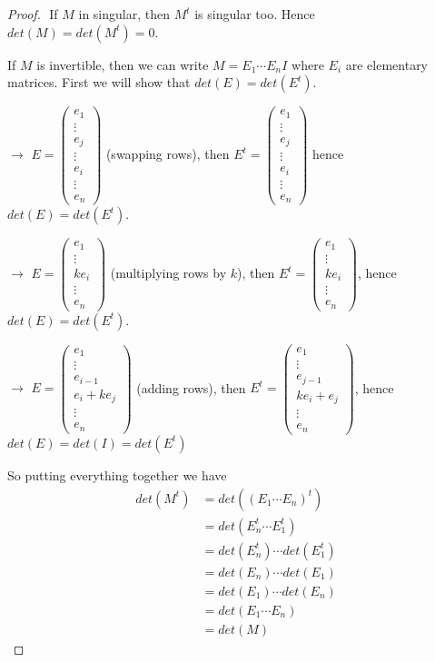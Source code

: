 \documentclass{article}
\begin{document}
\begin{proof}
$ $\newline
If $M$ in singular, then $M^t$ is singular too. Hence $det(M) = det(M^t) = 0$.
\smallskip

If $M$ is invertible, then we can write $M = E_1 \cdots E_nI$ where $E_i$ are elementary matrices. First we will show that $det(E) = det(E^t)$. 

$\rightarrow$ $E= \begin{pmatrix} e_1 \\ \vdots \\ e_j \\ \vdots \\ e_i \\ \vdots \\e_n \end{pmatrix}$ (swapping rows), then $E^t = \begin{pmatrix} e_1 \\ \vdots \\ e_j \\ \vdots \\ e_i \\ \vdots \\e_n \end{pmatrix}$ hence $det(E) = det(E^t)$.

$\rightarrow$ $E= \begin{pmatrix} e_1  \\ \vdots \\ ke_i \\ \vdots \\e_n \end{pmatrix}$ (multiplying rows by $k$), then $E^t = \begin{pmatrix} e_1  \\ \vdots \\ ke_i \\ \vdots \\e_n \end{pmatrix}$, hence $det(E) = det(E^t)$.

$\rightarrow$ $E= \begin{pmatrix} e_1  \\ \vdots \\ e_{i-1} \\ e_i + ke_j \\ \vdots \\e_n \end{pmatrix}$ (adding rows), then $E^t = \begin{pmatrix} e_1  \\ \vdots \\ e_{j-1} \\ ke_i + e_j \\ \vdots \\e_n \end{pmatrix}$, hence $det(E) = det(I) = det(E^t)$

So putting everything together we have
\begin{align*}
det(M^t) &= det((E_1\cdots E_n)^t) \\
&= det(E_n^t \cdots E_1^t) \\
&= det(E_n^t) \cdots det(E_1^t) \\
&= det(E_n) \cdots det(E_1) \\
&= det(E_1) \cdots det(E_n)\\
&= det(E_1 \cdots E_n) \\
&=det(M)
\end{align*}
\end{proof}
\end{document}
